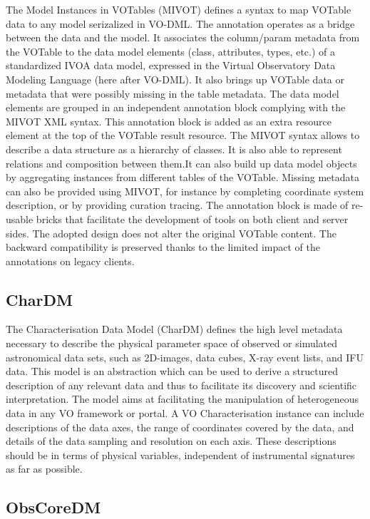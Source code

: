 \documentclass[11pt,letter]{ivoa}
\begin{document}
The Model Instances in VOTables (MIVOT) \citep{2023ivoa.spec.0620M}
defines a syntax to map VOTable data to any model serizalized in VO-DML.
The annotation operates as a bridge between the data and the model. It
associates the column/param metadata from the VOTable to the data model
elements (class, attributes, types, etc.) of a standardized IVOA data
model, expressed in the Virtual Observatory Data Modeling Language (here
after VO-DML). It also brings up VOTable data or metadata that were
possibly missing in the table metadata. The data model elements are
grouped in an independent annotation block complying with the MIVOT XML
syntax. This annotation block is added as an extra resource element at
the top of the VOTable result resource. The MIVOT syntax allows to
describe a data structure as a hierarchy of classes. It is also able to
represent relations and composition between them.It can also build up
data model objects by aggregating instances from different tables of the
VOTable. Missing metadata can also be provided using MIVOT, for instance
by completing coordinate system description, or by providing curation
tracing. The annotation block is made of re-usable bricks that
facilitate the development of tools on both client and server sides. The
adopted design does not alter the original VOTable content. The backward
compatibility is preserved thanks to the limited impact of the
annotations on legacy clients.


\subsection{CharDM} 

The Characterisation Data Model (CharDM) \citep{2008ivoa.spec.0325L}
defines the high level metadata necessary to describe the
physical parameter space of observed or simulated astronomical data
sets, such as 2D-images,
data cubes, X-ray event lists, and IFU data. This model is an
abstraction which can be used
to derive a structured description of any relevant data and thus to
facilitate its discovery
and scientific interpretation. The model aims at facilitating the
manipulation of heterogeneous
data in any VO framework or portal. A VO Characterisation instance can
include descriptions of
the data axes, the range of coordinates covered by the data, and details
of the data sampling
and resolution on each axis. These descriptions should be in terms of
physical variables,
independent of instrumental signatures as far as possible.

\subsection{ObsCoreDM}
\end{document}
